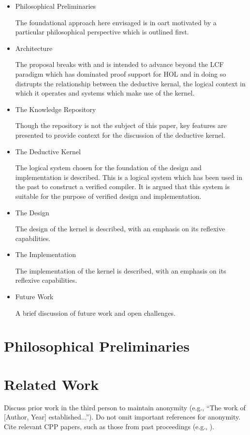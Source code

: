 \documentclass[sigplan,10pt,anonymous,review]{acmart}
\begin{document}
\begin{itemize}
  \item Philosophical Preliminaries
  
  The foundational approach here envisaged is in oart motivated by
  a particular philosophical perspective which is outlined first.
\item Architecture

The proposal breaks with and is intended to advance beyond the LCF paradigm which has dominated
proof support for HOL and in doing so distrupts the relationship between
the deductive kernal, the logical context in which it operates and systems
which make use of the kernel.

\item The Knowledge Repository

Though the repository is not the subject of this paper,
key features are presented to provide context for the discussion of the deductive kernel.

  \item The Deductive Kernel
  

  
  The logical system chosen for the foundation of the design and implementation is described.
  This is a logical system which has been used in the past to construct a verified compiler.
  It is argued that this system is suitable for the purpose of verified design and implementation.
  
  \item The Design
  
  The design of the kernel is described, with an emphasis on its reflexive capabilities.
  
  \item The Implementation
  
  The implementation of the kernel is described, with an emphasis on its reflexive capabilities.
  
  \item Future Work
  
  A brief discussion of future work and open challenges.

\end{itemize}

\section{Philosophical Preliminaries}



\section{Related Work}
Discuss prior work in the third person to maintain anonymity (e.g., ``The work of [Author, Year] established...''). Do not omit important references for anonymity. Cite relevant CPP papers, such as those from past proceedings 
(e.g., ).
\end{document}
